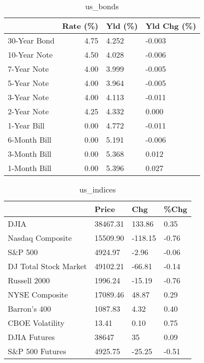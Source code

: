 \documentclass{article}%
\begin{document}
%


\begin{table}[htbp]%
\caption{us\_bonds}%
\centering%
\begin{adjustbox}{width=1\textwidth}%
\begin{tabular}{lrll}
\toprule
             &  Rate (\%) & Yld (\%) & Yld Chg (\%) \\
\midrule
30-Year Bond &      4.75 &   4.252 &      -0.003 \\
10-Year Note &      4.50 &   4.028 &      -0.006 \\
 7-Year Note &      4.00 &   3.999 &      -0.005 \\
 5-Year Note &      4.00 &   3.964 &      -0.005 \\
 3-Year Note &      4.00 &   4.113 &      -0.011 \\
 2-Year Note &      4.25 &   4.332 &       0.000 \\
 1-Year Bill &      0.00 &   4.772 &      -0.011 \\
6-Month Bill &      0.00 &   5.191 &      -0.006 \\
3-Month Bill &      0.00 &   5.368 &       0.012 \\
1-Month Bill &      0.00 &   5.396 &       0.027 \\
\bottomrule
\end{tabular}
%
\end{adjustbox}%
\end{table}

%


\begin{table}[htbp]%
\caption{us\_indices}%
\centering%
\begin{adjustbox}{width=1\textwidth}%
\begin{tabular}{llll}
\toprule
                      &    Price &     Chg &  \%Chg \\
\midrule
                 DJIA & 38467.31 &  133.86 &  0.35 \\
     Nasdaq Composite & 15509.90 & -118.15 & -0.76 \\
              S\&P 500 &  4924.97 &   -2.96 & -0.06 \\
DJ Total Stock Market & 49102.21 &  -66.81 & -0.14 \\
         Russell 2000 &  1996.24 &  -15.19 & -0.76 \\
       NYSE Composite & 17089.46 &   48.87 &  0.29 \\
         Barron's 400 &  1087.83 &    4.32 &  0.40 \\
      CBOE Volatility &    13.41 &    0.10 &  0.75 \\
         DJIA Futures &    38647 &      35 &  0.09 \\
      S\&P 500 Futures &  4925.75 &  -25.25 & -0.51 \\
\bottomrule
\end{tabular}
%
\end{adjustbox}%
\end{table}
\end{document}
